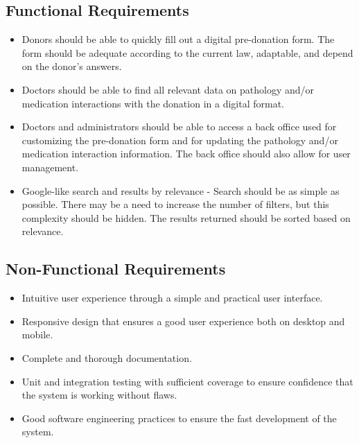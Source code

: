 \documentclass[a4paper,11pt]{article}
\begin{document}
\subsection{Functional Requirements}
\begin{itemize}
	\item Donors should be able to quickly fill out a digital pre-donation form. The form should be adequate according to the current law, adaptable, and depend on the donor’s answers.
	
	\item Doctors should be able to find all relevant data on pathology and/or medication interactions with the donation in a digital format.
	
	\item Doctors and administrators should be able to access a back office used for customizing the pre-donation form and for updating the pathology and/or medication interaction information. The back office should also allow for user management.
	
	\item Google-like search and results by relevance - Search should be as simple as possible. There may be a need to increase the number of filters, but this complexity should be hidden. The results returned should be sorted based on relevance.
\end{itemize}

\subsection{Non-Functional Requirements}
\begin{itemize}
	\item Intuitive user experience through a simple and practical user interface.
	
	\item Responsive design that ensures a good user experience both on desktop and mobile.
	
	\item Complete and thorough documentation.
	
	\item Unit and integration testing with sufficient coverage to ensure confidence that the system is working without flaws.
	
	\item Good software engineering practices to ensure the fast development of the system.
\end{itemize}
\end{document}
